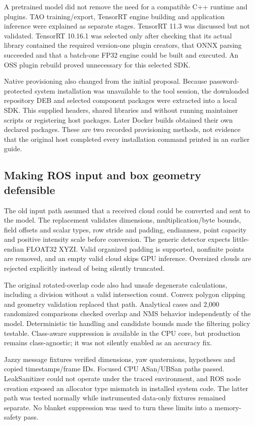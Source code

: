 \documentclass[11pt,a4paper]{article}
\newcommand{\code}[1]{\texttt{\detokenize{#1}}}
\begin{document}
A pretrained model did not remove the need for a compatible C++ runtime and plugins. TAO training/export, TensorRT engine building and application inference were explained as separate stages. TensorRT 11.3 was discussed but not validated. TensorRT 10.16.1 was selected only after checking that its actual library contained the required version-one plugin creators, that ONNX parsing succeeded and that a batch-one FP32 engine could be built and executed. An OSS plugin rebuild proved unnecessary for this selected SDK.

Native provisioning also changed from the initial proposal. Because password-protected system installation was unavailable to the tool session, the downloaded repository DEB and selected component packages were extracted into a local SDK. This supplied headers, shared libraries and \code{trtexec} without running maintainer scripts or registering host packages. Later Docker builds obtained their own declared packages. These are two recorded provisioning methods, not evidence that the original host completed every installation command printed in an earlier guide.

\subsection{Making ROS input and box geometry defensible}

The old input path assumed that a received cloud could be converted and sent to the model. The replacement validates dimensions, multiplication/byte bounds, field offsets and scalar types, row stride and padding, endianness, point capacity and positive intensity scale before conversion. The generic detector expects little-endian FLOAT32 XYZI. Valid organized padding is supported, nonfinite points are removed, and an empty valid cloud skips GPU inference. Oversized clouds are rejected explicitly instead of being silently truncated.

The original rotated-overlap code also had unsafe degenerate calculations, including a division without a valid intersection count. Convex polygon clipping and geometry validation replaced that path. Analytical cases and 2,000 randomized comparisons checked overlap and NMS behavior independently of the model. Deterministic tie handling and candidate bounds made the filtering policy testable. Class-aware suppression is available in the CPU core, but production remains class-agnostic; it was not silently enabled as an accuracy fix.

Jazzy message fixtures verified dimensions, yaw quaternions, hypotheses and copied timestamps/frame IDs. Focused CPU ASan/UBSan paths passed. LeakSanitizer could not operate under the traced environment, and ROS node creation exposed an allocator type mismatch in installed system code. The latter path was tested normally while instrumented data-only fixtures remained separate. No blanket suppression was used to turn these limits into a memory-safety pass.
\end{document}
